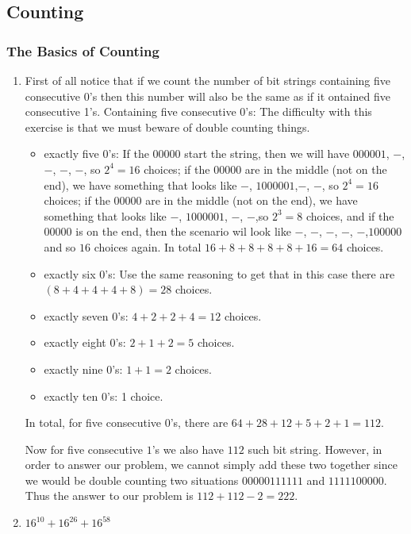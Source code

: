 \documentclass{../../cls/sig-alternate-05-2015}
\begin{document}
\subsection{Counting}
\subsubsection{The Basics of Counting}
\begin{enumerate}
    \item First of all notice that if we count the number of bit strings containing five consecutive 0's then this number will also be the same as if it ontained five consecutive 1's.
        Containing five consecutive $0$'s: The difficulty with this exercise is that we must beware of double counting things.
        \begin{itemize}
            \item exactly five $0$'s: If the $00000$ start the string, then we will have $000001$, $-$, $-$, $-$, $-$, so $2^4=16$ choices; if the $00000$ are in the middle (not on the end), we have something that looks like $-$, $1000001$,$-$, $-$, so $2^4=16$ choices; if the $00000$ are in the middle (not on the end), we have something that looks like $-$, $1000001$, $-$, $-$,so $2^3=8$ choices, and if the $00000$ is on the end, then the scenario wil look like $-$, $-$, $-$, $-$, $-$,$100000$ and so $16$ choices again. In total $16+8+8+8+8+16=64$ choices.
            \item exactly six $0$'s: Use the same reasoning to get that in this case there are $(8+4+4+4+8)=28$ choices.
            \item exactly seven $0$'s: $4+2+2+4=12$ choices.
            \item exactly eight $0$'s: $2+1+2=5$ choices.
            \item exactly nine $0$'s: $1+1=2$ choices.
            \item exactly ten $0$'s: 1 choice.
        \end{itemize}
        
        In total, for five consecutive $0$'s, there are $64+28+12+5+2+1=112$.
        
        Now for five consecutive $1$'s we also have $112$ such bit string. However, in order to answer our problem, we cannot simply add these two together since we would be double counting two situations $00000111111$ and $1111100000$. Thus the answer to our problem is $112+112-2=222$.

    \item $16^{10} + 16^{26} + 16^{58}$



\end{enumerate}
\end{document}

